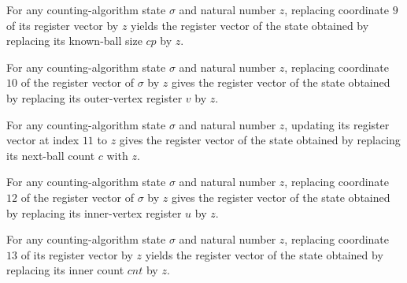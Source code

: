 \begin{lemma}
\label{Complexity.LogProg.ISCount.St.upd_cp}
\leanok
{}
For any counting-algorithm state $\sigma$ and natural number $z$, replacing coordinate
$9$ of its register vector by $z$ yields the register vector of the state obtained by
replacing its known-ball size $cp$ by $z$.
\end{lemma}

\begin{lemma}
\label{Complexity.LogProg.ISCount.St.upd_v}
\leanok
{}
For any counting-algorithm state $\sigma$ and natural number $z$, replacing coordinate
$10$ of the register vector of $\sigma$ by $z$ gives the register vector of the state
obtained by replacing its outer-vertex register $v$ by $z$.
\end{lemma}

\begin{lemma}
\label{Complexity.LogProg.ISCount.St.upd_c}
\leanok
{}
For any counting-algorithm state $\sigma$ and natural number $z$, updating its register
vector at index $11$ to $z$ gives the register vector of the state obtained by replacing
its next-ball count $c$ with $z$.
\end{lemma}

\begin{lemma}
\label{Complexity.LogProg.ISCount.St.upd_u}
\leanok
{}
For any counting-algorithm state $\sigma$ and natural number $z$, replacing coordinate
$12$ of the register vector of $\sigma$ by $z$ gives the register vector of the state
obtained by replacing its inner-vertex register $u$ by $z$.
\end{lemma}

\begin{lemma}
\label{Complexity.LogProg.ISCount.St.upd_cnt}
\leanok
{}
For any counting-algorithm state $\sigma$ and natural number $z$, replacing coordinate
$13$ of its register vector by $z$ yields the register vector of the state obtained by
replacing its inner count $cnt$ by $z$.
\end{lemma}

